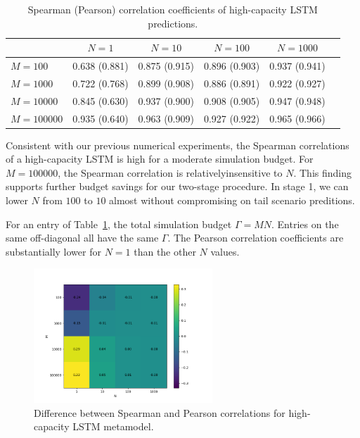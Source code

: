 \begin{table}[ht!]
    \small
    \centering
    \begin{tabular}{lccccc}
        \toprule
                           & $N=\num{1}$   & $N=\num{10}$  & $N=\num{100}$ & $N=\num{1000}$ \\
        \midrule
        $M = \num{100}$    & 0.638 (0.881) & 0.875 (0.915) & 0.896 (0.903) & 0.937 (0.941) \\
        $M = \num{1000}$   & 0.722 (0.768) & 0.899 (0.908) & 0.886 (0.891) & 0.922 (0.927) \\
        $M = \num{10000}$  & 0.845 (0.630) & 0.937 (0.900) & 0.908 (0.905) & 0.947 (0.948) \\
        $M = \num{100000}$ & 0.935 (0.640) & 0.963 (0.909) & 0.927 (0.922) & 0.965 (0.966) \\
        \bottomrule
    \end{tabular}
    \caption{Spearman (Pearson) correlation coefficients of high-capacity LSTM predictions.}
    \label{tab2:lstm_corr}
\end{table}

Consistent with our previous numerical experiments, the Spearman correlations of a high-capacity LSTM is high for a moderate simulation budget. 
For $M= \num{100000}$, the Spearman correlation is relativelyinsensitive to $N$.
This finding supports further budget savings for our two-stage procedure.
In stage 1, we can lower $N$ from $\num{100}$ to $\num{10}$ almost without compromising on tail scenario preditions. 

For an entry of Table~\ref{tab2:lstm_corr}, the total simulation budget $\Gamma = M N$. 
Entries on the same off-diagonal all have the same $\Gamma$.
The Pearson correlation coefficients are substantially lower for $N=\num{1}$ than the other $N$ values.

\begin{figure}
    \centering
    \includegraphics[width=0.6\textwidth]{./project2/figures/cor_heatmap.png}
    \caption{Difference between Spearman and Pearson correlations for high-capacity LSTM metamodel.}
    \label{fig2:cor-heatmap}
\end{figure}

